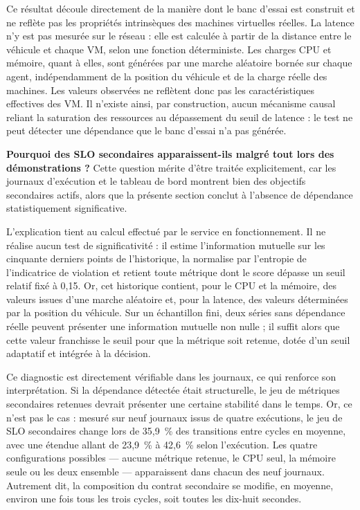 Ce résultat découle directement de la manière dont le banc d'essai est construit et ne reflète pas les propriétés intrinsèques des machines virtuelles réelles. La latence n'y est pas mesurée sur le réseau : elle est calculée à partir de la distance entre le véhicule et chaque VM, selon une fonction déterministe. Les charges CPU et mémoire, quant à elles, sont générées par une marche aléatoire bornée sur chaque agent, indépendamment de la position du véhicule et de la charge réelle des machines. Les valeurs observées ne reflètent donc pas les caractéristiques effectives des VM. Il n'existe ainsi, par construction, aucun mécanisme causal reliant la saturation des ressources au dépassement du seuil de latence : le test ne peut détecter une dépendance que le banc d'essai n'a pas générée.

\textbf{Pourquoi des SLO secondaires apparaissent-ils malgré tout lors des démonstrations ?} Cette question mérite d'être traitée explicitement, car les journaux d'exécution et le tableau de bord montrent bien des objectifs secondaires actifs, alors que la présente section conclut à l'absence de dépendance statistiquement significative.

L'explication tient au calcul effectué par le service en fonctionnement. Il ne réalise aucun test de significativité : il estime l'information mutuelle sur les cinquante derniers points de l'historique, la normalise par l'entropie de l'indicatrice de violation et retient toute métrique dont le score dépasse un seuil relatif fixé à 0,15. Or, cet historique contient, pour le CPU et la mémoire, des valeurs issues d'une marche aléatoire et, pour la latence, des valeurs déterminées par la position du véhicule. Sur un échantillon fini, deux séries sans dépendance réelle peuvent présenter une information mutuelle non nulle ; il suffit alors que cette valeur franchisse le seuil pour que la métrique soit retenue, dotée d'un seuil adaptatif et intégrée à la décision.

Ce diagnostic est directement vérifiable dans les journaux, ce qui renforce son interprétation. Si la dépendance détectée était structurelle, le jeu de métriques secondaires retenues devrait présenter une certaine stabilité dans le temps. Or, ce n'est pas le cas : mesuré sur neuf journaux issus de quatre exécutions, le jeu de SLO secondaires change lors de 35,9~\% des transitions entre cycles en moyenne, avec une étendue allant de 23,9~\% à 42,6~\% selon l'exécution. Les quatre configurations possibles — aucune métrique retenue, le CPU seul, la mémoire seule ou les deux ensemble — apparaissent dans chacun des neuf journaux. Autrement dit, la composition du contrat secondaire se modifie, en moyenne, environ une fois tous les trois cycles, soit toutes les dix-huit secondes.

